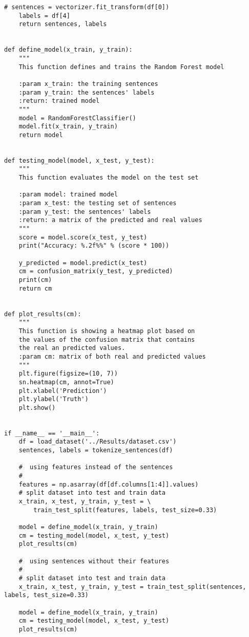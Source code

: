 \begin{lstlisting}[language=iPython]
	# sentences = vectorizer.fit_transform(df[0])
	labels = df[4]
	return sentences, labels


def define_model(x_train, y_train):
	"""
	This function defines and trains the Random Forest model
	
	:param x_train: the training sentences
	:param y_train: the sentences' labels
	:return: trained model
	"""
	model = RandomForestClassifier()
	model.fit(x_train, y_train)
	return model


def testing_model(model, x_test, y_test):
	"""
	This function evaluates the model on the test set
	
	:param model: trained model
	:param x_test: the testing set of sentences
	:param y_test: the sentences' labels
	:return: a matrix of the predicted and real values
	"""
	score = model.score(x_test, y_test)
	print("Accuracy: %.2f%%" % (score * 100))
	
	y_predicted = model.predict(x_test)
	cm = confusion_matrix(y_test, y_predicted)
	print(cm)
	return cm


def plot_results(cm):
	"""
	This function is showing a heatmap plot based on
	the values of the confusion matrix that contains
	the real an predicted values.
	:param cm: matrix of both real and predicted values
	"""
	plt.figure(figsize=(10, 7))
	sn.heatmap(cm, annot=True)
	plt.xlabel('Prediction')
	plt.ylabel('Truth')
	plt.show()


if __name__ == '__main__':
	df = load_dataset('../Results/dataset.csv')
	sentences, labels = tokenize_sentences(df)
	
	#  using features instead of the sentences
	#
	features = np.asarray(df[df.columns[1:4]].values)
	# split dataset into test and train data
	x_train, x_test, y_train, y_test = \
		train_test_split(features, labels, test_size=0.33)
	
	model = define_model(x_train, y_train)
	cm = testing_model(model, x_test, y_test)
	plot_results(cm)
	
	#  using sentences without their features
	#
	# split dataset into test and train data
	x_train, x_test, y_train, y_test = train_test_split(sentences, labels, test_size=0.33)
	
	model = define_model(x_train, y_train)
	cm = testing_model(model, x_test, y_test)
	plot_results(cm)

\end{lstlisting}
